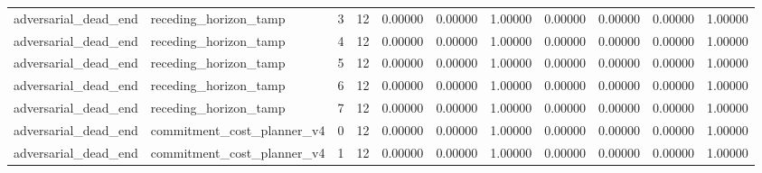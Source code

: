 \documentclass{article}
\begin{document}
\begin{table}[tbp]
{\begin{tabular}{lllllllllll}
adversarial\_dead\_end & receding\_horizon\_tamp & 3 & 12 & 0.00000 & 0.00000 & 1.00000 & 0.00000 & 0.00000 & 0.00000 & 1.00000 \\
adversarial\_dead\_end & receding\_horizon\_tamp & 4 & 12 & 0.00000 & 0.00000 & 1.00000 & 0.00000 & 0.00000 & 0.00000 & 1.00000 \\
adversarial\_dead\_end & receding\_horizon\_tamp & 5 & 12 & 0.00000 & 0.00000 & 1.00000 & 0.00000 & 0.00000 & 0.00000 & 1.00000 \\
adversarial\_dead\_end & receding\_horizon\_tamp & 6 & 12 & 0.00000 & 0.00000 & 1.00000 & 0.00000 & 0.00000 & 0.00000 & 1.00000 \\
adversarial\_dead\_end & receding\_horizon\_tamp & 7 & 12 & 0.00000 & 0.00000 & 1.00000 & 0.00000 & 0.00000 & 0.00000 & 1.00000 \\
adversarial\_dead\_end & commitment\_cost\_planner\_v4 & 0 & 12 & 0.00000 & 0.00000 & 1.00000 & 0.00000 & 0.00000 & 0.00000 & 1.00000 \\
adversarial\_dead\_end & commitment\_cost\_planner\_v4 & 1 & 12 & 0.00000 & 0.00000 & 1.00000 & 0.00000 & 0.00000 & 0.00000 & 1.00000 \\
\bottomrule
\end{tabular}
}
\end{table}

\clearpage
\end{document}
